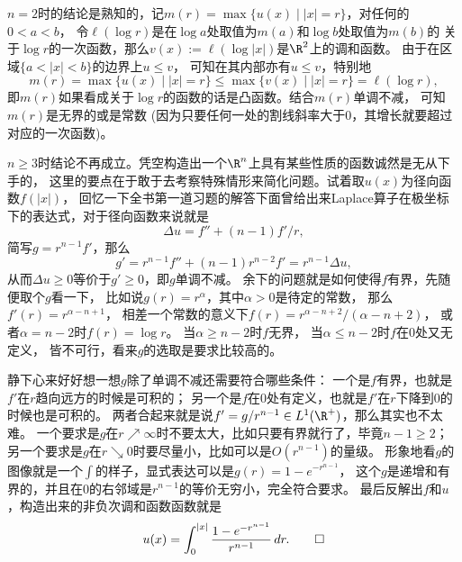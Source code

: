 \begin{proofc}[7 (2) 的解答]
    $n=2$时的结论是熟知的，记$m(r)=\max\{u(x)\mid|x|=r\}$，对任何的$0<a<b$，
    令$\ell(\log r)$是在$\log a$处取值为$m(a)$和$\log b$处取值为$m(b)$的
    关于$\log r$的一次函数，那么$v(x):=\ell(\log|x|)$是$\R^2$上的调和函数。
    由于在区域$\{a<|x|<b\}$的边界上$u \leqslant v$，
    可知在其内部亦有$u \leqslant v$，特别地
    \[m(r)=\max\{u(x)\mid|x|=r\}\leqslant\max\{v(x)\mid|x|=r\}=\ell(\log r),\]
    即$m(r)$如果看成关于$\log r$的函数的话是凸函数。结合$m(r)$单调不减，
    可知$m(r)$是无界的或是常数 (因为只要任何一处的割线斜率大于$0$，其增长就要超过对应的一次函数)。
    $n\geqslant3$时结论不再成立。凭空构造出一个$\R^n$上具有某些性质的函数诚然是无从下手的，
    这里的要点在于敢于去考察特殊情形来简化问题。试着取$u(x)$为径向函数$f(|x|)$，
    回忆一下全书第一道习题的解答下面曾给出来Laplace算子在极坐标下的表达式，对于径向函数来说就是
    \[\Delta u=f''+(n-1)f'/r,\]
    简写$g=r^{n-1}f'$，那么
    \[g'=r^{n-1}f''+(n-1)r^{n-2}f'=r^{n-1}\Delta u,\]
    从而$\Delta u\geqslant0$等价于$g'\geqslant0$，即$g$单调不减。
    余下的问题就是如何使得$f$有界，先随便取个$g$看一下，
    比如说$g(r)=r^\alpha$，其中$\alpha>0$是待定的常数，
    那么$f'(r)=r^{\alpha-n+1}$，
    相差一个常数的意义下$f(r)=r^{\alpha-n+2}/(\alpha-n+2)$，
    或者$\alpha=n-2$时$f(r)=\log r$。
    当$\alpha \geqslant n-2$时$f$无界，
    当$\alpha \leqslant n-2$时$f$在$0$处又无定义，
    皆不可行，看来$g$的选取是要求比较高的。
    
    静下心来好好想一想$g$除了单调不减还需要符合哪些条件：
    一个是$f$有界，也就是$f'$在$r$趋向远方的时候是可积的；
    另一个是$f$在$0$处有定义，也就是$f'$在$r$下降到$0$的时候也是可积的。
    两者合起来就是说$f'=g/r^{n-1} \in L^1(\R^+)$，那么其实也不太难。
    一个要求是$g$在$r\nearrow\infty$时不要太大，比如只要有界就行了，毕竟$n-1\geqslant2$；
    另一个要求是$g$在$r\searrow0$时要尽量小，比如可以是$O(r^{n-1})$的量级。
    形象地看$g$的图像就是一个$\int$的样子，显式表达可以是$g(r)=1-e^{-r^{n-1}}$，
    这个$g$是递增和有界的，并且在$0$的右邻域是$r^{n-1}$的等价无穷小，完全符合要求。
    最后反解出$f$和$u$，构造出来的非负次调和函数函数就是
    \[u(x)=\int_0^{|x|}\frac{1-e^{-r^{n-1}}}{r^{n-1}}\,dr.\qedhere\]
\end{proofc}

